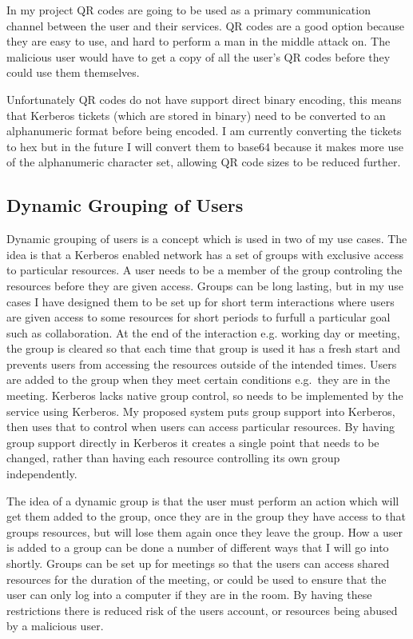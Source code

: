 \documentclass[]{report}   %
\begin{document}
In my project QR codes are going to be used as a primary communication channel between the user and their services. QR codes are a good option because they are easy to use, and hard to perform a man in the middle attack on. The malicious user would have to get a copy of all the user's QR codes before they could use them themselves.

Unfortunately QR codes do not have support direct binary encoding, this means that Kerberos tickets (which are stored in binary) need to be converted to an alphanumeric format before being encoded. I am currently converting the tickets to hex but in the future I will convert them to base64 because it makes more use of the alphanumeric character set, allowing QR code sizes to be reduced further.

\subsection{Dynamic Grouping of Users}
Dynamic grouping of users is a concept which is used in two of my use cases. The idea is that a Kerberos enabled network has a set of groups with exclusive access to particular resources. A user needs to be a member of the group controling the resources before they are given access. Groups can be long lasting, but in my use cases I have designed them to be set up for short term interactions where users are given access to some resources for short periods to furfull a particular goal such as collaboration. At the end of the interaction e.g. working day or meeting, the group is cleared so that each time that group is used it has a fresh start and prevents users from accessing the resources outside of the intended times. Users are added to the group when they meet certain conditions e.g.\ they are in the meeting. Kerberos lacks native group control, so needs to be implemented by the service using Kerberos. My proposed system puts group support into Kerberos, then uses that to control when users can access particular resources. By having group support directly in Kerberos it creates a single point that needs to be changed, rather than having each resource controlling its own group independently.

The idea of a dynamic group is that the user must perform an action which will get them added to the group, once they are in the group they have access to that groups resources, but will lose them again once they leave the group. How a user is added to a group can be done a number of different ways that I will go into shortly. Groups can be set up for meetings so that the users can access shared resources for the duration of the meeting, or could be used to ensure that the user can only log into a computer if they are in the room. By having these restrictions there is reduced risk of the users account, or resources being abused by a malicious user.
\end{document}
